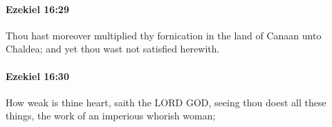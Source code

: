 		\paragraph{Ezekiel 16:29} %
			\label{EZEKIEL-16-29}

			Thou hast moreover multiplied thy fornication in the land of Canaan unto Chaldea; and yet thou wast not satisfied herewith.


		\paragraph{Ezekiel 16:30} %
			\label{EZEKIEL-16-30}

			How weak is thine heart, saith the LORD GOD, seeing thou doest all these things, the work of an imperious whorish woman;


